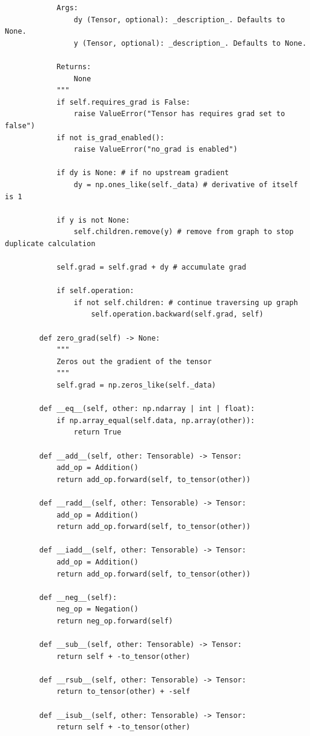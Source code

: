 \documentclass{article}
\begin{document}
\begin{verbatim}
            Args:
                dy (Tensor, optional): _description_. Defaults to None.
                y (Tensor, optional): _description_. Defaults to None.

            Returns:
                None
            """
            if self.requires_grad is False:
                raise ValueError("Tensor has requires grad set to false")
            if not is_grad_enabled():
                raise ValueError("no_grad is enabled")

            if dy is None: # if no upstream gradient
                dy = np.ones_like(self._data) # derivative of itself is 1

            if y is not None: 
                self.children.remove(y) # remove from graph to stop duplicate calculation

            self.grad = self.grad + dy # accumulate grad

            if self.operation:
                if not self.children: # continue traversing up graph
                    self.operation.backward(self.grad, self)

        def zero_grad(self) -> None:
            """
            Zeros out the gradient of the tensor
            """
            self.grad = np.zeros_like(self._data)

        def __eq__(self, other: np.ndarray | int | float):
            if np.array_equal(self.data, np.array(other)):
                return True

        def __add__(self, other: Tensorable) -> Tensor:
            add_op = Addition()
            return add_op.forward(self, to_tensor(other))

        def __radd__(self, other: Tensorable) -> Tensor:
            add_op = Addition()
            return add_op.forward(self, to_tensor(other))

        def __iadd__(self, other: Tensorable) -> Tensor:
            add_op = Addition()
            return add_op.forward(self, to_tensor(other))

        def __neg__(self):
            neg_op = Negation()
            return neg_op.forward(self)

        def __sub__(self, other: Tensorable) -> Tensor:
            return self + -to_tensor(other)

        def __rsub__(self, other: Tensorable) -> Tensor:
            return to_tensor(other) + -self

        def __isub__(self, other: Tensorable) -> Tensor:
            return self + -to_tensor(other)


\end{verbatim}
\end{document}
